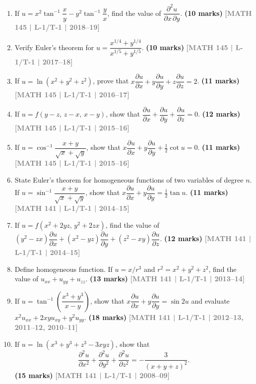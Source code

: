 \documentclass[12pt,a3paper]{article}
\newcommand{\yr}[1]{\hfill\textcolor{gray}{\small\textbf{[#1]}}}
\newcommand{\mk}[1]{\textcolor{orange!70!black}{\small\textbf{(#1 marks)}}}
\begin{document}
\begin{enumerate}
\item If $u=x^{2}\tan^{-1}\!\dfrac{x}{y}-y^{2}\tan^{-1}\!\dfrac{y}{x}$, find the value of $\dfrac{\partial^{2}u}{\partial x\,\partial y}$.
\mk{10} \yr{MATH 145 | L-1/T-1 | 2018--19}

\item Verify Euler's theorem for $u=\dfrac{x^{1/4}+y^{1/4}}{x^{1/5}+y^{1/5}}$.
\mk{10} \yr{MATH 145 | L-1/T-1 | 2017--18}

\item If $u=\ln(x^{2}+y^{2}+z^{2})$, prove that $x\dfrac{\partial u}{\partial x}+y\dfrac{\partial u}{\partial y}+z\dfrac{\partial u}{\partial z}=2$.
\mk{11} \yr{MATH 145 | L-1/T-1 | 2016--17}

\item If $u=f(y-z,\,z-x,\,x-y)$, show that $\dfrac{\partial u}{\partial x}+\dfrac{\partial u}{\partial y}+\dfrac{\partial u}{\partial z}=0$.
\mk{12} \yr{MATH 145 | L-1/T-1 | 2015--16}

\item If $u=\cos^{-1}\!\dfrac{x+y}{\sqrt{x}+\sqrt{y}}$, show that $x\dfrac{\partial u}{\partial x}+y\dfrac{\partial u}{\partial y}+\tfrac{1}{2}\cot u=0$.
\mk{11} \yr{MATH 145 | L-1/T-1 | 2015--16}

\item State Euler's theorem for homogeneous functions of two variables of degree $n$. If $u=\sin^{-1}\!\dfrac{x+y}{\sqrt{x}+\sqrt{y}}$, show that $x\dfrac{\partial u}{\partial x}+y\dfrac{\partial u}{\partial y}=\tfrac{1}{2}\tan u$.
\mk{11} \yr{MATH 141 | L-1/T-1 | 2014--15}

\item If $u=f(x^{2}+2yz,\,y^{2}+2zx)$, find the value of $(y^{2}-zx)\dfrac{\partial u}{\partial x}+(x^{2}-yz)\dfrac{\partial u}{\partial y}+(z^{2}-xy)\dfrac{\partial u}{\partial z}$.
\mk{12} \yr{MATH 141 | L-1/T-1 | 2014--15}

\item Define homogeneous function. If $u=x/r^{3}$ and $r^{2}=x^{2}+y^{2}+z^{2}$, find the value of $u_{xx}+u_{yy}+u_{zz}$.
\mk{13} \yr{MATH 141 | L-1/T-1 | 2013--14}

\item If $u=\tan^{-1}\!\left(\dfrac{x^{3}+y^{3}}{x-y}\right)$, show that $x\dfrac{\partial u}{\partial x}+y\dfrac{\partial u}{\partial y}=\sin 2u$ and evaluate $x^{2}u_{xx}+2xyu_{xy}+y^{2}u_{yy}$.
\mk{18} \yr{MATH 141 | L-1/T-1 | 2012--13, 2011--12, 2010--11}

\item If $u=\ln(x^{3}+y^{3}+z^{3}-3xyz)$, show that
\[
\frac{\partial^{2}u}{\partial x^{2}}+\frac{\partial^{2}u}{\partial y^{2}}+\frac{\partial^{2}u}{\partial z^{2}}=-\frac{3}{(x+y+z)^{2}}.
\]
\mk{15} \yr{MATH 141 | L-1/T-1 | 2008--09}


\end{enumerate}
\end{document}
